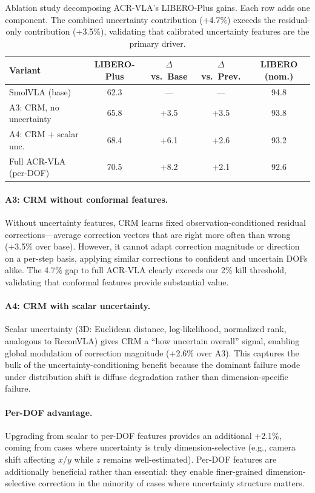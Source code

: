 \documentclass[letterpaper]{article}
\begin{document}
\begin{table}[h]
\centering
\caption{Ablation study decomposing ACR-VLA's LIBERO-Plus gains. Each row adds one component. The combined uncertainty contribution (+4.7\%) exceeds the residual-only contribution (+3.5\%), validating that calibrated uncertainty features are the primary driver.}
\label{tab:ablation}
\begin{tabular}{lcccc}
\toprule
Variant & LIBERO-Plus & $\Delta$ vs.\ Base & $\Delta$ vs.\ Prev. & LIBERO (nom.) \\
\midrule
SmolVLA (base) & 62.3 & --- & --- & 94.8 \\
A3: CRM, no uncertainty & 65.8 & +3.5 & +3.5 & 93.8 \\
A4: CRM + scalar unc. & 68.4 & +6.1 & +2.6 & 93.2 \\
Full ACR-VLA (per-DOF) & 70.5 & +8.2 & +2.1 & 92.6 \\
\bottomrule
\end{tabular}
\end{table}

\paragraph{A3: CRM without conformal features.}
Without uncertainty features, CRM learns fixed observation-conditioned residual corrections---average correction vectors that are right more often than wrong (+3.5\% over base).
However, it cannot adapt correction magnitude or direction on a per-step basis, applying similar corrections to confident and uncertain DOFs alike.
The 4.7\% gap to full ACR-VLA clearly exceeds our 2\% kill threshold, validating that conformal features provide substantial value.

\paragraph{A4: CRM with scalar uncertainty.}
Scalar uncertainty (3D: Euclidean distance, log-likelihood, normalized rank, analogous to ReconVLA) gives CRM a ``how uncertain overall'' signal, enabling global modulation of correction magnitude (+2.6\% over A3).
This captures the bulk of the uncertainty-conditioning benefit because the dominant failure mode under distribution shift is diffuse degradation rather than dimension-specific failure.

\paragraph{Per-DOF advantage.}
Upgrading from scalar to per-DOF features provides an additional +2.1\%, coming from cases where uncertainty is truly dimension-selective (e.g., camera shift affecting $x$/$y$ while $z$ remains well-estimated).
Per-DOF features are additionally beneficial rather than essential: they enable finer-grained dimension-selective correction in the minority of cases where uncertainty structure matters.
\end{document}
